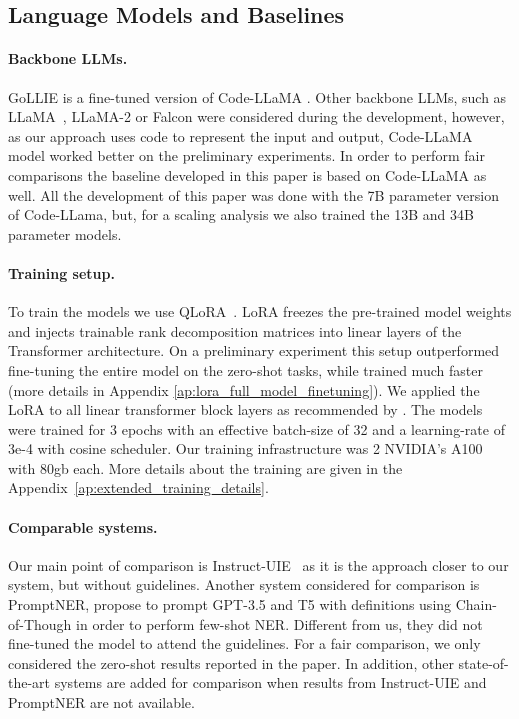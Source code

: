 \documentclass{article} \usepackage{iclr2024_conference,times}
\newcommand{\GoLLIE}{\scalerel*{\texttt{[image: logo/GoLLIE.pdf]}}{\textrm{\textbigcircle}} }
\begin{document}
\subsection{Language Models and Baselines}

\paragraph{Backbone LLMs.} \GoLLIE GoLLIE is a fine-tuned version of Code-LLaMA \cite{DBLP:journals/corr/abs-2308-12950}. Other backbone LLMs, such as LLaMA~\citep{DBLP:journals/corr/abs-2302-13971}, LLaMA-2 \cite{DBLP:journals/corr/abs-2307-09288} or Falcon \cite{DBLP:journals/corr/abs-2306-01116} were considered during the development, however, as our approach uses code to represent the input and output, Code-LLaMA model worked better on the preliminary experiments. In order to perform fair comparisons the baseline developed in this paper is based on Code-LLaMA as well. All the development of this paper was done with the 7B parameter version of Code-LLama, but, for a scaling analysis we also trained the 13B and 34B parameter models.

\paragraph{Training setup.} To train the models we use QLoRA~\citep{lora, qlora}. LoRA freezes the pre-trained model weights and injects trainable rank decomposition matrices into linear layers of the Transformer architecture. On a preliminary experiment this setup outperformed fine-tuning the entire model on the zero-shot tasks, while trained much faster (more details in Appendix \ref{ap:lora_full_model_finetuning}). We applied the LoRA to all linear transformer block layers as recommended by \cite{qlora}. The models were trained for 3 epochs with an effective batch-size of 32 and a learning-rate of 3e-4 with cosine scheduler. Our training infrastructure was 2 NVIDIA's A100 with 80gb each. More details about the training are given in the Appendix~\ref{ap:extended_training_details}.


\paragraph{Comparable systems.} Our main point of comparison is Instruct-UIE~\citep{DBLP:journals/corr/abs-2304-08085} as it is the approach closer to our system, but without guidelines. Another system considered for comparison is PromptNER, \cite{ashok2023promptner} propose to prompt GPT-3.5 and T5 with definitions using Chain-of-Though in order to perform few-shot NER. Different from us, they did not fine-tuned the model to attend the guidelines. For a fair comparison, we only considered the zero-shot results reported in the paper. In addition, other state-of-the-art systems are added for comparison when results from Instruct-UIE and PromptNER are not available.
\end{document}
